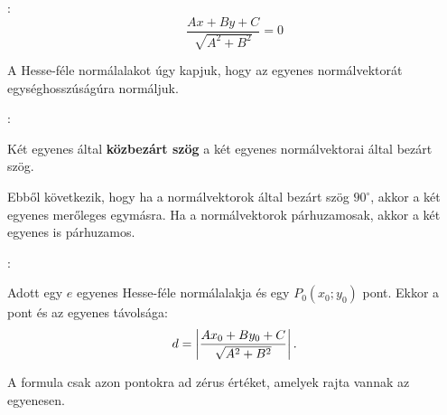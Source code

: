 \documentclass[a4paper, 12pt]{scrartcl}
\begin{document}
\begin{blueBox}
  :
  \[
    \frac{Ax + By + C}{\sqrt{A^2 + B^2}} = 0
  \]

  A Hesse-féle normálalakot úgy kapjuk, hogy az egyenes normálvektorát
  egységhosszúságúra normáljuk.
\end{blueBox}

\begin{blueBox}
  :

  Két egyenes által \textbf{közbezárt szög} a két egyenes normálvektorai által
  bezárt szög.

  Ebből következik, hogy ha a normálvektorok által bezárt szög $90^\circ$,
  akkor a két egyenes merőleges egymásra. Ha a normálvektorok párhuzamosak,
  akkor a két egyenes is párhuzamos.
\end{blueBox}

\begin{blueBox}
  :

  \begin{minipage}{.625\textwidth}
    Adott egy $e$ egyenes Hesse-féle normálalakja és egy $P_0(x_0; y_0)$ pont.
    Ekkor a pont és az egyenes távolsága:
    \[
      d = \left|
      \frac{Ax_0 + By_0 + C}{\sqrt{A^2 + B^2}}
      \right|
      \text.
    \]
  \end{minipage}\begin{minipage}{.375\textwidth}
    \centering
  \end{minipage}

  A formula csak azon pontokra ad zérus értéket, amelyek rajta vannak az
  egyenesen.
\end{blueBox}
\end{document}
